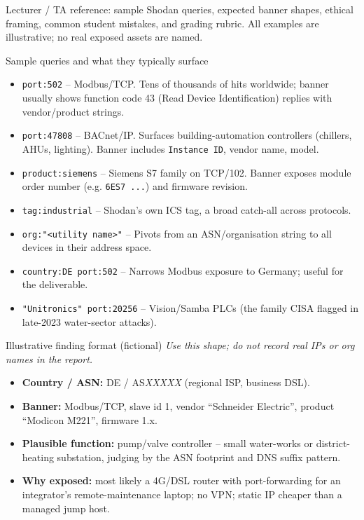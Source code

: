 \documentclass[11pt,a4paper]{article}
\begin{document}
\labheader

\begin{goalbox}
Lecturer / TA reference: sample Shodan queries, expected banner shapes, ethical framing, common student mistakes, and grading rubric. All examples are illustrative; no real exposed assets are named.
\end{goalbox}

\begin{solutionbox}{Sample queries and what they typically surface}
\begin{itemize}\setlength{\itemsep}{1pt}
  \item \texttt{port:502} -- Modbus/TCP. Tens of thousands of hits worldwide; banner usually shows function code 43 (Read Device Identification) replies with vendor/product strings.
  \item \texttt{port:47808} -- BACnet/IP. Surfaces building-automation controllers (chillers, AHUs, lighting). Banner includes \texttt{Instance ID}, vendor name, model.
  \item \texttt{product:siemens} -- Siemens S7 family on TCP/102. Banner exposes module order number (e.g. \texttt{6ES7 ...}) and firmware revision.
  \item \texttt{tag:industrial} -- Shodan's own ICS tag, a broad catch-all across protocols.
  \item \texttt{org:"<utility name>"} -- Pivots from an ASN/organisation string to all devices in their address space.
  \item \texttt{country:DE port:502} -- Narrows Modbus exposure to Germany; useful for the deliverable.
  \item \texttt{"Unitronics" port:20256} -- Vision/Samba PLCs (the family CISA flagged in late-2023 water-sector attacks).
\end{itemize}
\end{solutionbox}

\begin{solutionbox}{Illustrative finding format (fictional)}
\textit{Use this shape; do not record real IPs or org names in the report.}
\begin{itemize}\setlength{\itemsep}{1pt}
  \item \textbf{Country / ASN:} DE / AS\textit{XXXXX} (regional ISP, business DSL).
  \item \textbf{Banner:} Modbus/TCP, slave id 1, vendor ``Schneider Electric'', product ``Modicon M221'', firmware 1.x.
  \item \textbf{Plausible function:} pump/valve controller -- small water-works or district-heating substation, judging by the ASN footprint and DNS suffix pattern.
  \item \textbf{Why exposed:} most likely a 4G/DSL router with port-forwarding for an integrator's remote-maintenance laptop; no VPN; static IP cheaper than a managed jump host.
\end{itemize}
\end{solutionbox}
\end{document}
